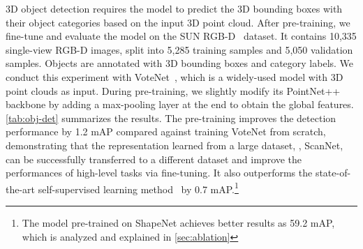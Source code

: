 \documentclass[10pt,twocolumn,letterpaper]{article}
\makeatletter
\renewcommand{\paragraph}{\@startsection{paragraph}{4}{\z@}{0ex \@plus 0ex \@minus 0ex}{-1em}{\hskip\parindent\normalfont\normalsize\bfseries}}
\makeatother
\begin{document}
\paragraph{3D Object Detection}

3D object detection requires the model to predict the 3D bounding boxes with their object categories based on the input 3D point cloud. After pre-training, we fine-tune and evaluate the model on the SUN RGB-D~\cite{song2015sun} dataset. It contains 10,335 single-view RGB-D images, split into 5,285 training samples and 5,050 validation samples. Objects are annotated with 3D bounding boxes and category labels. We conduct this experiment with VoteNet~\cite{qi2019deep}, which is a widely-used model with 3D point clouds as input. During pre-training, we slightly modify its PointNet++~\cite{qi2017pointnet++} backbone by adding a max-pooling layer at the end to obtain the global features. \cref{tab:obj-det} summarizes the results. The pre-training improves the detection performance by 1.2 mAP compared against training VoteNet from scratch, demonstrating that the representation learned from a large dataset, \ie, ScanNet, can be successfully transferred to a different dataset and improve the performances of high-level tasks via fine-tuning. It also outperforms the state-of-the-art self-supervised learning method~\cite{xie2020pointcontrast} by 0.7 mAP.\footnote{The model pre-trained on ShapeNet achieves better results as 59.2 mAP, which is analyzed and explained in \cref{sec:ablation}}

\begin{table}[htb!]
    \centering
    \caption{\textbf{3D object detection fine-tuned on SUN RGB-D}}
    \label{tab:obj-det}
    \end{table}
\end{document}
